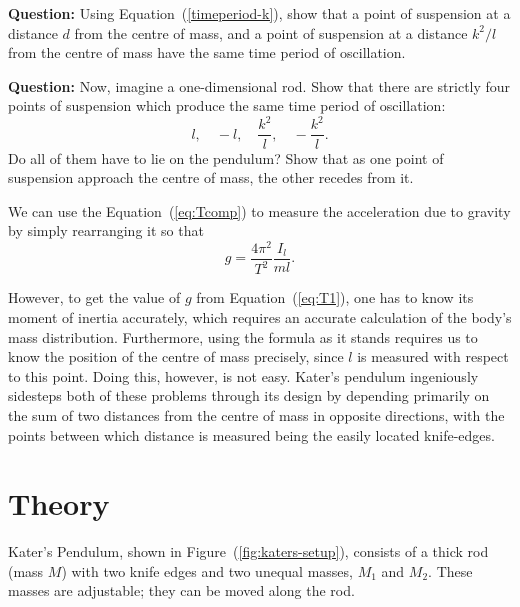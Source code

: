 \begin{question}
\textbf{Question:} Using Equation~(\ref{timeperiod-k}), show that a point of suspension at a distance $d$ from the centre of mass, and a point of suspension at a distance $k^2/l$ from the centre of mass have the same time period of oscillation.

\textbf{Question:} Now, imagine a one-dimensional rod. Show that there are strictly four points of suspension which produce the same time period of oscillation:
\begin{equation}
    l, \quad -l, \quad \frac{k^2}{l}, \quad -\frac{k^2}{l}.
\end{equation}
Do all of them have to lie on the pendulum? Show that as one point of suspension approach the centre of mass, the other recedes from it.
\end{question}

We can use the Equation~(\ref{eq:Tcomp}) to measure the acceleration due to gravity by simply rearranging it so that 
\begin{equation}
    g=\frac{4\pi^2}{T^2}\frac{I_l}{ml}.
    \label{eq:T1}
\end{equation}

However, to get the value of $g$ from Equation~(\ref{eq:T1}), one has to know its moment of inertia accurately, which requires an accurate calculation of the body's mass distribution. Furthermore, using the formula as it stands requires us to know the position of the centre of mass precisely, since $l$ is measured with respect to this point. Doing this, however, is not easy. Kater's pendulum ingeniously sidesteps both of these problems through its design by depending primarily on the sum of two distances from the centre of mass in opposite directions, with the points between which distance is measured being the easily located knife-edges.


\section*{Theory}

Kater's Pendulum, shown in Figure~(\ref{fig:katers-setup}), consists of a thick rod (mass $M$) with two knife edges and two unequal masses, $M_1$ and $M_2$. These masses are adjustable; they can be moved along the rod.

